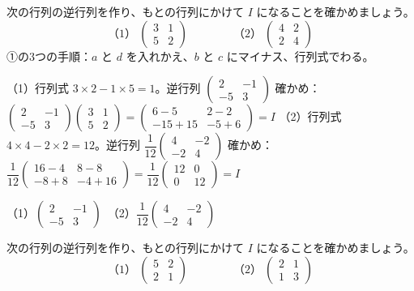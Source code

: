 \begin{reidai}[2×2 の逆行列を作って確かめる]
次の行列の逆行列を作り、もとの行列にかけて $I$ になることを確かめましょう。
\[ \text{（1）}\ \begin{pmatrix}3&1\\5&2\end{pmatrix}\qquad\qquad \text{（2）}\ \begin{pmatrix}4&2\\2&4\end{pmatrix} \]
\kangaekata ①の3つの手順：$a$ と $d$ を入れかえ、$b$ と $c$ にマイナス、行列式でわる。\par
\shiki（1）行列式 $3\times2-1\times5=1$。逆行列 $\begin{pmatrix}2&-1\\-5&3\end{pmatrix}$\kviifq
確かめ：$\begin{pmatrix}2&-1\\-5&3\end{pmatrix}\begin{pmatrix}3&1\\5&2\end{pmatrix}=\begin{pmatrix}6-5&2-2\\-15+15&-5+6\end{pmatrix}=I$\kviifq
（2）行列式 $4\times4-2\times2=12$。逆行列 $\dfrac{1}{12}\begin{pmatrix}4&-2\\-2&4\end{pmatrix}$\kviifq
確かめ：$\dfrac{1}{12}\begin{pmatrix}16-4&8-8\\-8+8&-4+16\end{pmatrix}=\dfrac{1}{12}\begin{pmatrix}12&0\\0&12\end{pmatrix}=I$\par
\kotae（1）\nobreak $\begin{pmatrix}2&-1\\-5&3\end{pmatrix}$　（2）\nobreak $\dfrac{1}{12}\begin{pmatrix}4&-2\\-2&4\end{pmatrix}$
\end{reidai}

\begin{jibun}
次の行列の逆行列を作り、もとの行列にかけて $I$ になることを確かめましょう。
\[ \text{（1）}\ \begin{pmatrix}5&2\\2&1\end{pmatrix}\qquad\qquad \text{（2）}\ \begin{pmatrix}2&1\\1&3\end{pmatrix} \]
\end{jibun}

